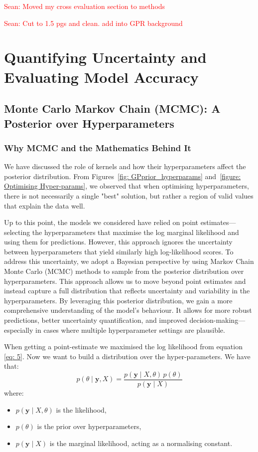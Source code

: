 \documentclass[11pt]{article}
\newcommand{\Sean}[1]{{\textcolor{red}{{Sean: #1}} }}
\begin{document}
\Sean{Moved my cross evaluation section to methods}


\Sean{Cut to 1.5 pgs and clean. add into GPR background}
\section{Quantifying Uncertainty and Evaluating Model Accuracy}
\label{sec:uncertainty_and_evaluation}
\subsection{Monte Carlo Markov Chain (MCMC): A Posterior over Hyperparameters}
\label{sec: MCMC}

\subsubsection*{Why MCMC and the Mathematics Behind It}

We have discussed the role of kernels and how their hyperparameters affect the posterior distribution. From Figures~\ref{fig: GPprior_hyperparams} and~\ref{figure: Optimising Hyper-params}, we observed that when optimising hyperparameters, there is not necessarily a single "best" solution, but rather a region of valid values that explain the data well.

\noindent
Up to this point, the models we considered have relied on point estimates—selecting the hyperparameters that maximise the log marginal likelihood and using them for predictions. However, this approach ignores the uncertainty between hyperparameters that yield similarly high log-likelihood scores.
To address this uncertainty, we adopt a Bayesian perspective by using Markov Chain Monte Carlo (MCMC) methods to sample from the posterior distribution over hyperparameters. This approach allows us to move beyond point estimates and instead capture a full distribution that reflects uncertainty and variability in the hyperparameters.
By leveraging this posterior distribution, we gain a more comprehensive understanding of the model's behaviour. It allows for more robust predictions, better uncertainty quantification, and improved decision-making—especially in cases where multiple hyperparameter settings are plausible.

\bigskip
\noindent
When getting a point-estimate we maximised the log likelihood from equation \ref{eq: 5}. Now we want to build a distribution over the hyper-parameters. We have that:
\[
p(\theta \mid \mathbf{y}, X) = \frac{p(\mathbf{y} \mid X, \theta) \, p(\theta)}{p(\mathbf{y} \mid X)}
\]
where:
\begin{itemize}
    \item \( p(\mathbf{y} \mid X, \theta) \) is the likelihood,
    \item \( p(\theta) \) is the prior over hyperparameters,
    \item \( p(\mathbf{y} \mid X) \) is the marginal likelihood, acting as a normalising constant.
\end{itemize}
\end{document}
